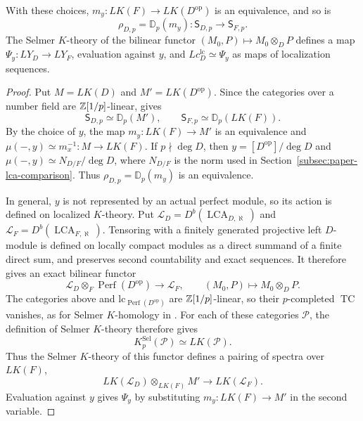 \begin{lemma}\label{lem:paper-lca-selmer-evaluation}
With these choices, $m_y\colon LK(F)\to LK(D^{\mathrm{op}})$ is an equivalence, and so is
\[
 \rho_{D,p}=\mathbb{D}_p(m_y)\colon\mathsf S_{D,p}\longrightarrow\mathsf S_{F,p}.
\]
The Selmer $K$-theory of the bilinear functor $(M_0,P)\mapsto M_0\otimes_DP$ defines a map $\Psi_y\colon LY_D\to LY_F$, evaluation against $y$, and $Lc^{\mathrm{lc}}_D\simeq\Psi_y$ as maps of localization sequences.
\end{lemma}
\begin{proof}
Put $M=LK(D)$ and $M'=LK(D^{\mathrm{op}})$.
Since the categories over a number field are $\mathbb Z[1/p]$-linear, \cite[Proposition 2.11]{ClausenArtin} gives
\[
 \mathsf S_{D,p}\simeq \mathbb{D}_p(M'),\qquad
 \mathsf S_{F,p}\simeq \mathbb{D}_p(LK(F)).
\]
By the choice of $y$, the map $m_y\colon LK(F)\to M'$ is an equivalence and $\mu(-,y)\simeq m_x^{-1}\colon M\to LK(F)$.
If $p\nmid \deg D$, then $y=[D^{\mathrm{op}}]/\deg D$ and $\mu(-,y)\simeq N_{D/F}/\deg D$, where $N_{D/F}$ is the norm used in Section~\ref{subsec:paper-lca-comparison}.
Thus $\rho_{D,p}=\mathbb D_p(m_y)$ is an equivalence.

In general, $y$ is not represented by an actual perfect module, so its action is defined on localized $K$-theory.
Put $\mathcal L_D=D^b(\operatorname{LCA}_{D,\aleph})$ and $\mathcal L_F=D^b(\operatorname{LCA}_{F,\aleph})$.
Tensoring with a finitely generated projective left $D$-module is defined on locally compact modules as a direct summand of a finite direct sum, and preserves second countability and exact sequences.
It therefore gives an exact bilinear functor
\[
 \mathcal L_D\otimes_F\operatorname{Perf}(D^{\mathrm{op}})
       \longrightarrow\mathcal L_F,
 \qquad (M_0,P)\longmapsto M_0\otimes_D P.
\]
The categories above and $\mathrm{lc}_{\operatorname{Perf}(D^{\mathrm{op}})}$ are $\mathbb Z[1/p]$-linear, so their $p$-completed $\operatorname{TC}$ vanishes, as for Selmer $K$-homology in \cite[Proposition 2.11]{ClausenArtin}.
For each of these categories $\mathcal P$, the definition of Selmer $K$-theory therefore gives
\[
 K^{\mathrm{Sel}}_p(\mathcal P)\simeq LK(\mathcal P).
\]
Thus the Selmer $K$-theory of this functor defines a pairing of spectra over $LK(F)$,
\[
 LK(\mathcal L_D)\otimes_{LK(F)}M'\longrightarrow LK(\mathcal L_F).
\]
Evaluation against $y$ gives $\Psi_y$ by substituting $m_y\colon LK(F)\to M'$ in the second variable.


\end{proof}
